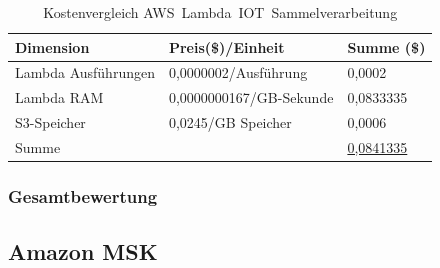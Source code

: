 \begin{table}[H]
\centering
\begin{tabular}{|l|l|l|}
\hline
Dimension & Preis(\$)/Einheit & Summe (\$) \\ \hline
Lambda Ausführungen & 0,0000002/Ausführung & 0,0002 \\ \hline
Lambda \ac{RAM} & 0,0000000167/GB-Sekunde & 0,0833335 \\ \hline
\ac{S3}-Speicher & 0,0245/GB Speicher & 0,0006 \\ \hline
Summe & \cellcolor[HTML]{EFEFEF} & \underline{0,0841335} \\ \hline
\end{tabular}
\caption{Kostenvergleich AWS~Lambda~IOT~Sammelverarbeitung}
\label{tab:kostenvergleich-AWS~Lambda~IOT~Sammelverarbeitung}
\end{table}

\subsubsection{Gesamtbewertung}

\subsection{Amazon MSK}


